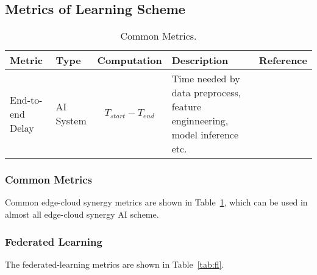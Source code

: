 \subsection{Metrics of Learning Scheme}


\begin{table}[h]
\caption{Common Metrics.} 
\label{tab:common}
\begin{tabular}{|l|l|p{3cm}|p{4cm}|p{4cm}|}
\hline
Metric                 & Type      & Computation & Description                                                                & Reference \\ \hline
End-to-end Delay
& AI System 
& 
\parbox{3cm}{
    \begin{equation} \label{equ:ed} 
    T_{start} - T_{end}
    \end{equation}
}
& Time needed by data preprocess, feature enginneering, model inference etc. 
&           
\\ \hline

\end{tabular}
\end{table}



\subsubsection{Common Metrics}
Common edge-cloud synergy metrics are shown in Table~\ref{tab:common}, which can be used in almost all edge-cloud synergy AI scheme.

\subsubsection{Federated Learning}

The federated-learning metrics are shown in Table~\ref{tab:fl}.



